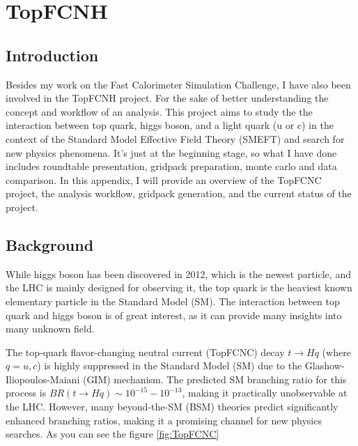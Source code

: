 
\chapter{TopFCNH} %

\label{AppendixB} %

% 
%
\section{Introduction}

Besides my work on the Fast Calorimeter Simulation Challenge, I have also been involved in the TopFCNH project. For the sake of better understanding the concept and workflow of an analysis. This project aims to study the the interaction between top quark, higgs boson, and a light quark (u or c) in the context of the Standard Model Effective Field Theory (SMEFT) and search for new physics phenomena. It's just at the beginning stage, so what I have done includes roundtable presentation, gridpack preparation, monte carlo and data comparison. In this appendix, I will provide an overview of the TopFCNC project, the analysis workflow, gridpack generation, and the current status of the project.

\section{Background}

While higgs boson has been discovered in 2012, which is the newest particle, and the LHC is mainly designed for observing it, the top quark is the heaviest known elementary particle in the Standard Model (SM). The interaction between top quark and higgs boson is of great interest, as it can provide many insights into many unknown field.

The top-quark flavor-changing neutral current (TopFCNC) decay $t \to Hq$ (where $q = u, c$) is highly suppressed in the Standard Model (SM) due to the Glashow-Iliopoulos-Maiani (GIM) mechanism. \cite{maiani_gim_2013} The predicted SM branching ratio for this process is $BR(t \to Hq) \sim 10^{-15} - 10^{-13}$, making it practically unobservable at the LHC. However, many beyond-the-SM (BSM) theories predict significantly enhanced branching ratios, making it a promising channel for new physics searches. As you can see the figure \ref{fig:TopFCNC}

